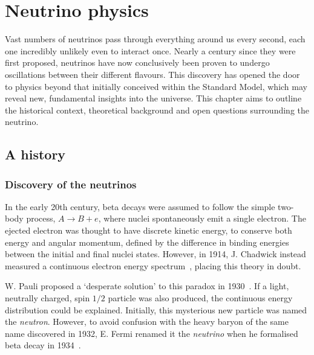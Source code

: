 \chapter{Neutrino physics} %
\label{chap:theory} %

Vast numbers of neutrinos pass through everything around us every second, each one incredibly
unlikely even to interact once. Nearly a century since they were first proposed, neutrinos have
now conclusively been proven to undergo oscillations between their different flavours. This
discovery has opened the door to physics beyond that initially conceived within the Standard
Model, which may reveal new, fundamental insights into the universe. This chapter aims to outline
the historical context, theoretical background and open questions surrounding the neutrino.

\section{A history} %
\label{sec:theory_history} %

\subsection{Discovery of the neutrinos} %
\label{sec:theory_history_neutrinos} %

In the early 20th century, beta decays were assumed to follow the simple two-body process,
$A\rightarrow B + e$, where nuclei spontaneously emit a single electron.  The ejected electron was
thought to have discrete kinetic energy, to conserve both energy and angular momentum, defined by
the difference in binding energies between the initial and final nuclei states. However, in 1914,
J. Chadwick instead measured a continuous electron energy spectrum~\cite{chadwick1914}, placing
this theory in doubt.

W. Pauli proposed a `desperate solution' to this paradox in 1930~\cite{pauli1930}. If a light,
neutrally charged, spin $1/2$ particle was also produced, the continuous energy distribution could
be explained. Initially, this mysterious new particle was named the \emph{neutron}. However, to
avoid confusion with the heavy baryon of the same name discovered in 1932, E. Fermi renamed it the
\emph{neutrino} when he formalised beta decay in 1934~\cite{fermi1934}.

